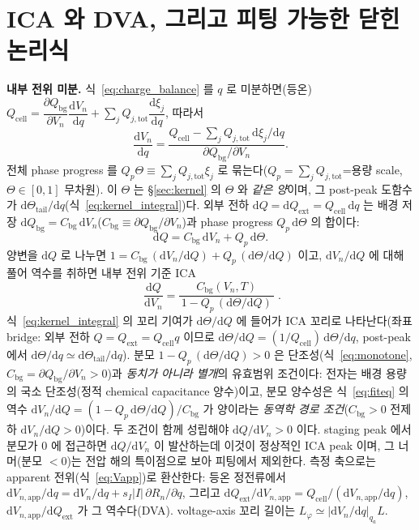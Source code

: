 \documentclass[11pt,a4paper]{article}
\newcommand{\dd}{\mathrm{d}}
\newcommand{\app}{\mathrm{app}}
\newcommand{\bg}{\mathrm{bg}}
\newcommand{\cell}{\mathrm{cell}}
\newcommand{\ext}{\mathrm{ext}}
\newcommand{\tot}{\mathrm{tot}}
\begin{document}
\section{ICA 와 DVA, 그리고 피팅 가능한 닫힌 논리식}\label{sec:fiteq}
\textbf{내부 전위 미분.} 식~\eqref{eq:charge_balance} 를 $q$ 로 미분하면(등온)
$Q_\cell=\dfrac{\partial Q_\bg}{\partial V_n}\dfrac{\dd V_n}{\dd q}+\sum_j Q_{j,\tot}\dfrac{\dd\xi_j}{\dd q}$,
따라서
\begin{equation}
\frac{\dd V_n}{\dd q}=\frac{Q_\cell-\sum_j Q_{j,\tot}\,\dd\xi_j/\dd q}{\partial Q_\bg/\partial V_n}.
\label{eq:dVdq}
\end{equation}
전체 phase progress 를 $Q_p\Theta\equiv\sum_j Q_{j,\tot}\xi_j$ 로 묶는다($Q_p=\sum_j Q_{j,\tot}$=용량 scale,
$\Theta\in[0,1]$ 무차원). 이 $\Theta$ 는 \S\ref{sec:kernel} 의 $\Theta$ 와 \emph{같은 양}이며, 그 post-peak
도함수가 $\dd\Theta_\mathrm{tail}/\dd q$(식~\eqref{eq:kernel_integral})다. 외부 전하 $\dd Q=\dd Q_\ext=
Q_\cell\,\dd q$ 는 배경 저장 $\dd Q_\bg=C_\bg\,\dd V_n$($C_\bg\equiv\partial Q_\bg/\partial V_n$)과
phase progress $Q_p\,\dd\Theta$ 의 합이다:
\begin{equation}
\dd Q=C_\bg\,\dd V_n+Q_p\,\dd\Theta.
\label{eq:dQsplit}
\end{equation}
양변을 $\dd Q$ 로 나누면 $1=C_\bg\,(\dd V_n/\dd Q)+Q_p\,(\dd\Theta/\dd Q)$ 이고, $\dd V_n/\dd Q$ 에 대해 풀어
역수를 취하면 내부 전위 기준 ICA
\begin{equation}
\boxed{\;\frac{\dd Q}{\dd V_n}=\frac{C_\bg(V_n,T)}{\,1-Q_p\,(\dd\Theta/\dd Q)\,}\;.}
\label{eq:fiteq}
\end{equation}
식~\eqref{eq:kernel_integral} 의 꼬리 기여가 $\dd\Theta/\dd Q$ 에 들어가 ICA 꼬리로 나타난다(좌표 bridge:
외부 전하 $Q=Q_\ext=Q_\cell q$ 이므로 $\dd\Theta/\dd Q=(1/Q_\cell)\,\dd\Theta/\dd q$, post-peak 에서
$\dd\Theta/\dd q\simeq\dd\Theta_\mathrm{tail}/\dd q$). 분모
$1-Q_p\,(\dd\Theta/\dd Q)>0$ 은 단조성(식~\eqref{eq:monotone}, $C_\bg=\partial Q_\bg/\partial V_n>0$)과
\emph{동치가 아니라 별개}의 유효범위 조건이다: 전자는 배경 용량의 국소 단조성(정적 chemical capacitance
양수)이고, 분모 양수성은 식~\eqref{eq:fiteq} 의 역수 $\dd V_n/\dd Q=(1-Q_p\,\dd\Theta/\dd Q)/C_\bg$ 가
양이라는 \emph{동역학 경로 조건}($C_\bg>0$ 전제하 $\dd V_n/\dd Q>0$)이다. 두 조건이 함께 성립해야
$\dd Q/\dd V_n>0$ 이다. staging peak 에서 분모가
$0$ 에 접근하면 $\dd Q/\dd V_n$ 이 발산하는데 이것이 정상적인 ICA peak 이며, 그 너머(분모 $<0$)는 전압 해의
특이점으로 보아 피팅에서 제외한다. 측정 축으로는
apparent 전위(식~\eqref{eq:Vapp})로 환산한다: 등온 정전류에서 $\dd V_{n,\app}/\dd q=\dd V_n/\dd q+
s_I|I|\,\partial R_n/\partial q$, 그리고 $\dd Q_\ext/\dd V_{n,\app}=Q_\cell/(\dd V_{n,\app}/\dd q)$,
$\dd V_{n,\app}/\dd Q_\ext$ 가 그 역수다(DVA). voltage-axis 꼬리 길이는 $L_\varphi\simeq|\dd V_n/\dd q|_{q_a}L$.
\end{document}
